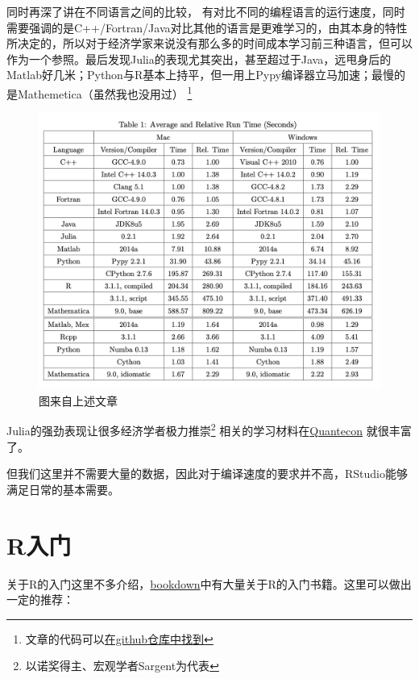 \documentclass[
  oneside]{book}
\begin{document}
同时再深了讲在不同语言之间的比较，\textcite{ARUOBA2015265} 有对比不同的编程语言的运行速度，同时需要强调的是C++/Fortran/Java对比其他的语言是更难学习的，由其本身的特性所决定的，所以对于经济学家来说没有那么多的时间成本学习前三种语言，但可以作为一个参照。最后发现Julia的表现尤其突出，甚至超过于Java，远甩身后的Matlab好几米；Python与R基本上持平，但一用上Pypy编译器立马加速；最慢的是Mathemetica（虽然我也没用过）
\footnote{文章的代码可以\href{https://github.com/jesusfv/Comparison-Programming-Languages-Economics}{在github仓库中找到}}

\begin{figure}

{\centering \includegraphics[width=18.86in]{image/com-jedc} 

}

\caption{图来自上述文章}\label{fig:com-jedc}
\end{figure}

Julia的强劲表现让很多经济学者极力推崇\footnote{以诺奖得主、宏观学者Sargent为代表} 相关的学习材料在\href{https://quantecon.org/}{Quantecon} 就很丰富了。

但我们这里并不需要大量的数据，因此对于编译速度的要求并不高，RStudio能够满足日常的基本需要。

\hypertarget{rux5165ux95e8}{%
\section{R入门}\label{rux5165ux95e8}}

关于R的入门这里不多介绍，\href{www.bookdown.org}{bookdown}中有大量关于R的入门书籍。这里可以做出一定的推荐：
\end{document}
